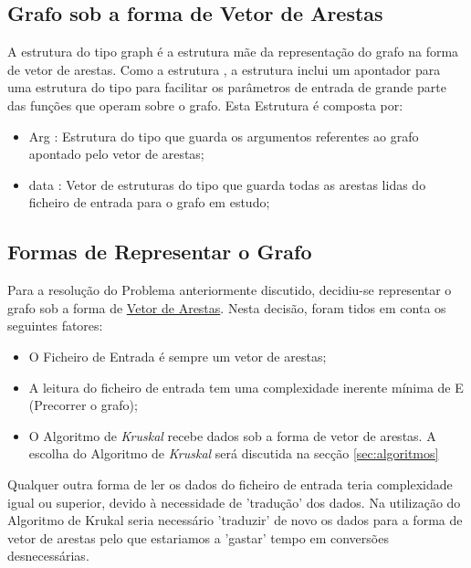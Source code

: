 \documentclass[14pt]{article}
\begin{document}
    \subsection[graph]{Grafo sob a forma de Vetor de Arestas}\label{subsec:grafo.v.are} 
    A estrutura do tipo graph é a estrutura mãe da representação do grafo na forma de vetor de arestas.
    Como a estrutura , a estrutura  inclui um apontador para uma estrutura
    do tipo  para facilitar os parâmetros de entrada de grande parte das funções que operam
    sobre o grafo.
    Esta Estrutura é composta por:
    \begin{itemize}
        \item Arg : Estrutura do tipo  que guarda os argumentos referentes ao grafo apontado pelo vetor de arestas;
        \item data : Vetor de estruturas do tipo  que guarda todas as arestas lidas do ficheiro de entrada para o grafo em estudo;
    \end{itemize}

    \subsection[Formas de Representar o Grafo]{Formas de Representar o Grafo}\label{subsec:formas.representar.grafo} 
    Para a resolução do Problema anteriormente discutido, decidiu-se representar o grafo sob a forma de \underline{Vetor de Arestas}.
    Nesta decisão, foram tidos em conta os seguintes fatores:
    \begin{itemize}
        \item O Ficheiro de Entrada é sempre um vetor de arestas;
        \item A leitura do ficheiro de entrada tem uma complexidade inerente mínima de E (Precorrer o grafo);
        \item O Algoritmo de \emph{Kruskal} recebe dados sob a forma de vetor de arestas. A escolha do Algoritmo de \emph{Kruskal} será discutida na secção \ref{sec:algoritmos}
    \end{itemize}

    Qualquer outra forma de ler os dados do ficheiro de entrada teria complexidade igual ou superior, devido à necessidade de 'tradução'
    dos dados. Na utilização do Algoritmo de Krukal seria necessário 'traduzir' de novo os dados para a forma de vetor de arestas pelo que
    estariamos a 'gastar' tempo em conversões desnecessárias.
\end{document}
